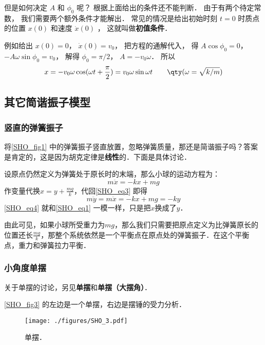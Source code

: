 但是如何决定 $A$ 和 $\phi_0$ 呢？ 根据上面给出的条件还不能判断． 由于有两个待定常数， 我们需要两个额外条件才能解出． 常见的情况是给出初始时刻 $t = 0$ 时质点的位置 $x(0)$ 和速度 $\dot x(0)$ ， 这就叫做\textbf{初值条件}．

例如给出 $x(0) = 0$，  $\dot x(0) = v_0$， 把方程的通解代入， 得 $A\cos \phi_0 = 0$，  $ - A\omega \sin \phi_0 = v_0$， 解得 $\phi_0 = \pi /2$，  $A =  -v_0\omega $． 所以
\begin{equation}
x =  - v_0\omega \cos (\omega t + \frac{\pi }{2}) = v_0\omega \sin \omega t \qquad \qty(\omega  = \sqrt{k/m})
\end{equation}


\subsection{其它简谐振子模型}

\subsubsection{竖直的弹簧振子}

将\autoref{SHO_fig1} 中的弹簧振子竖直放置，忽略弹簧质量，那还是简谐振子吗？答案是肯定的，这是因为胡克定律是\textbf{线性}的．下面是具体讨论．

设原点仍然定义为弹簧处于原长时的末端，那么小球的运动方程为：
\begin{equation}\label{SHO_eq3}
m\ddot{x} = -kx+mg
\end{equation}
作变量代换$x=y+\frac{mg}{k}$，代回\autoref{SHO_eq3} 即得
\begin{equation}\label{SHO_eq4}
m\ddot{y} = m\ddot{x} = -kx+mg = -ky
\end{equation}
\autoref{SHO_eq4} 就和\autoref{SHO_eq1} 一模一样，只是把$x$换成了$y$．

由此可见，如果小球所受重力为$mg$，那么我们只需要把原点定义为比弹簧原长的位置还长$\frac{mg}{k}$，那整个系统依然是一个平衡点在原点处的弹簧振子．在这个平衡点，重力和弹簧拉力平衡．


\subsubsection{小角度单摆}

关于单摆的讨论，另见\textbf{单摆}和\textbf{单摆（大摆角）}．

\autoref{SHO_fig3} 的左边是一个单摆，右边是摆锤的受力分析．

\begin{figure}[ht]
\centering
\texttt{[image: ./figures/SHO\_3.pdf]}
\caption{单摆．} \label{SHO_fig3}
\end{figure}

